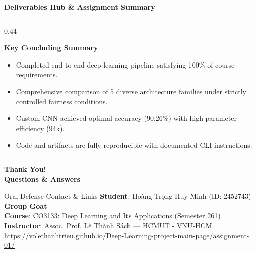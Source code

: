 \documentclass[aspectratio=169, 10pt]{beamer}
\begin{document}
\begin{frame}{\textbf{Deliverables Hub \& Assignment Summary}}
\begin{columns}[c]
\begin{column}{0.44\textwidth}
\begin{block}{\textbf{Key Concluding Summary}}
\begin{itemize}
          \item Completed end-to-end deep learning pipeline satisfying 100\% of course requirements.
          \item Comprehensive comparison of 5 diverse architecture families under strictly controlled fairness conditions.
          \item Custom CNN achieved optimal accuracy ($90.26\%$) with high parameter efficiency ($94\text{k}$).
          \item Code and artifacts are fully reproducible with documented CLI instructions.
        \end{itemize}
      \end{block}
    \end{column}
  \end{columns}
\end{frame}

\begin{frame}[plain]
  \centering
  \vspace{2.5em}
  {\Huge \textbf{\textcolor{hcmutnavy}{Thank You!}}} \\
  \vspace{1em}
  {\Large \textbf{\textcolor{hcmutblue}{Questions \& Answers}}} \\
  \vspace{1.5em}
  \begin{block}{\centering \small Oral Defense Contact \& Links}
    \centering\footnotesize
    \textbf{Student}: Hoàng Trọng Huy Minh (ID: 2452743) \quad \textbar \quad \textbf{Group Goat} \\
    \textbf{Course}: CO3133: Deep Learning and Its Applications (Semester 261) \\
    \textbf{Instructor}: Assoc. Prof. Lê Thành Sách — HCMUT - VNU-HCM \\
    \vspace{0.3em}
    \url{https://volethanhtrieu.github.io/Deep-Learning-project-main-page/assignment-01/}
  \end{block}
\end{frame}
\end{document}
